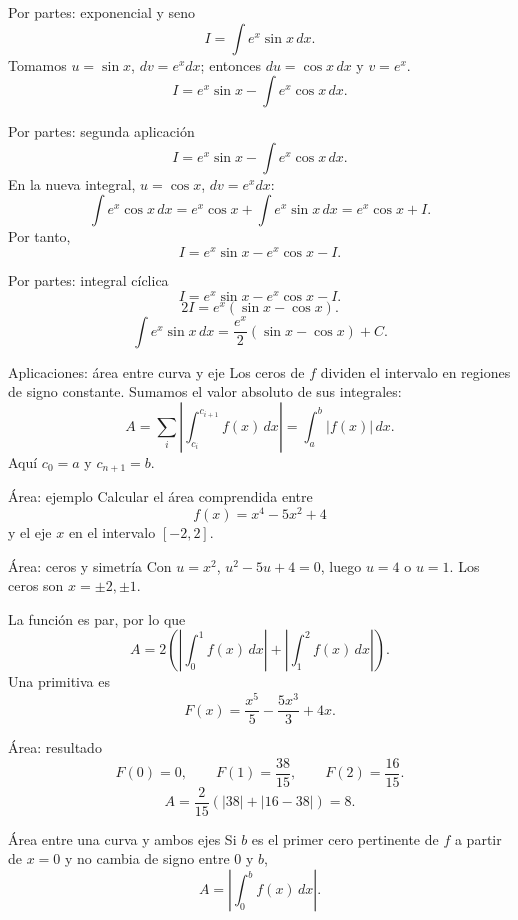 \documentclass[main.tex]{subfiles}
\begin{document}
\begin{frame}{Por partes: exponencial y seno}
\[I=\int e^x\sin x\,dx.\]Tomamos $u=\sin x$, $dv=e^x dx$; entonces $du=\cos x\,dx$ y $v=e^x$.\[I=e^x\sin x-\int e^x\cos x\,dx.\]
\end{frame}

\begin{frame}{Por partes: segunda aplicación}
\[I=e^x\sin x-\int e^x\cos x\,dx.\]En la nueva integral, $u=\cos x$, $dv=e^x dx$:\[\int e^x\cos x\,dx=e^x\cos x+\int e^x\sin x\,dx=e^x\cos x+I.\]Por tanto,\[I=e^x\sin x-e^x\cos x-I.\]
\end{frame}

\begin{frame}{Por partes: integral cíclica}
\[I=e^x\sin x-e^x\cos x-I.\]\[2I=e^x(\sin x-\cos x).\]\[\boxed{\int e^x\sin x\,dx=\frac{e^x}{2}(\sin x-\cos x)+C.}\]
\end{frame}

\begin{frame}{Aplicaciones: área entre curva y eje}
Los ceros de $f$ dividen el intervalo en regiones de signo constante. Sumamos el valor absoluto de sus integrales:\[A=\sum_i\left|\int_{c_i}^{c_{i+1}}f(x)\,dx\right|=\int_a^b|f(x)|\,dx.\]Aquí $c_0=a$ y $c_{n+1}=b$.
\end{frame}

\begin{frame}{Área: ejemplo}
Calcular el área comprendida entre\[f(x)=x^4-5x^2+4\]y el eje $x$ en el intervalo $[-2,2]$.
\end{frame}

\begin{frame}{Área: ceros y simetría}
\small Con $u=x^2$, $u^2-5u+4=0$, luego $u=4$ o $u=1$. Los ceros son $x=\pm2,\pm1$.\par\medskip La función es par, por lo que\[A=2\left(\left|\int_0^1f(x)\,dx\right|+\left|\int_1^2f(x)\,dx\right|\right).\]Una primitiva es\[F(x)=\frac{x^5}{5}-\frac{5x^3}{3}+4x.\]
\end{frame}

\begin{frame}{Área: resultado}
\[F(0)=0,\qquad F(1)=\frac{38}{15},\qquad F(2)=\frac{16}{15}.\]\[A=\frac2{15}(|38|+|16-38|)=\boxed{8}.\]
\end{frame}

\begin{frame}{Área entre una curva y ambos ejes}
Si $b$ es el primer cero pertinente de $f$ a partir de $x=0$ y no cambia de signo entre $0$ y $b$,\[A=\left|\int_0^b f(x)\,dx\right|.\]
\end{frame}
\end{document}
